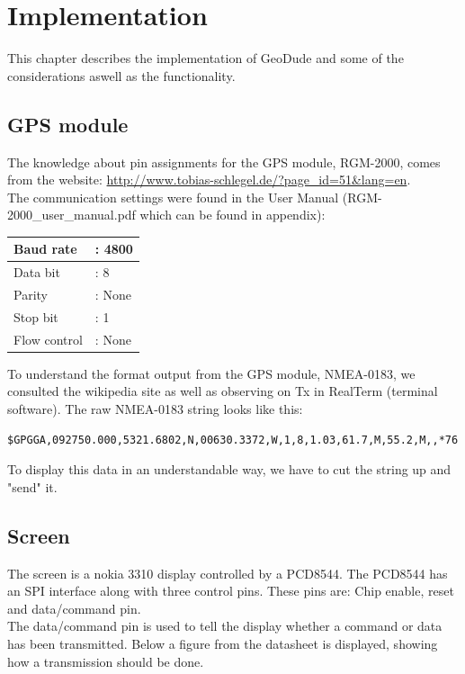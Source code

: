 \chapter{Implementation}
This chapter describes the implementation of GeoDude and some of the considerations aswell as the functionality.

\section{GPS module}
The knowledge about pin assignments for the GPS module, RGM-2000, comes from the website: \url{http://www.tobias-schlegel.de/?page_id=51&lang=en}.\\ 
The communication settings were found in the User Manual (RGM-2000\_user\_manual.pdf which can be found in appendix):\\
\begin{table}[H]
    \begin{tabular}{|ll|}
    \hline
    Baud rate    & : 4800 \\ \hline
    Data bit     & : 8    \\ \hline
    Parity       & : None \\ \hline
    Stop bit     & : 1    \\ \hline
    Flow control & : None \\ \hline
    \end{tabular}
\end{table}
To understand the format output from the GPS module, NMEA-0183, we consulted the wikipedia site as well as observing on Tx in RealTerm (terminal software). The raw NMEA-0183 string looks like this:\\
\begin{verbatim}
$GPGGA,092750.000,5321.6802,N,00630.3372,W,1,8,1.03,61.7,M,55.2,M,,*76
\end{verbatim}
To display this data in an understandable way, we have to cut the string up and "send" it. 

\section{Screen}
The screen is a nokia 3310 display controlled by a PCD8544. The PCD8544 has an SPI interface along with three control pins. These pins are: Chip enable, reset and data/command pin.\\
The data/command pin is used to tell the display whether a command or data has been transmitted. Below a figure from the datasheet is displayed, showing how a transmission should be done.

